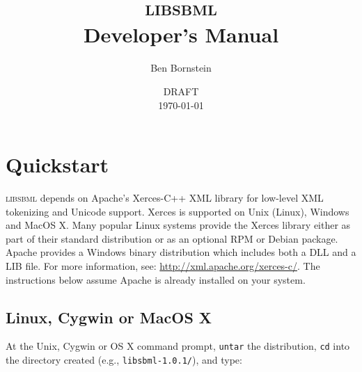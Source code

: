 \documentclass{sbmlmanual}
\newcommand{\libsbml}{\textsc{libsbml}}
\begin{document}

\title{\libsbml{}\\[5pt]
  Developer's Manual}

\author{Ben Bornstein}


\address{SBML Team\\
  Control and Dynamical Systems, MC 107-81\\
  California Institute of Technology, Pasadena, CA 91125, USA\\[3pt]
  {\url{http://sbml.org/}}}


\date{DRAFT\\[5pt]
  \today{}}

\maketitlepage




\section{Quickstart}
\label{sec:quickstart-unix}

\libsbml{} depends on Apache's Xerces-C++ XML library for
low-level XML tokenizing and Unicode support.  Xerces is supported on
Unix (Linux), Windows and MacOS X.  Many popular Linux systems provide
the Xerces library either as part of their standard distribution or as
an optional RPM or Debian package.  Apache provides a Windows binary
distribution which includes both a DLL and a LIB file.  For more
information, see: \url{http://xml.apache.org/xerces-c/}.  The
instructions below assume Apache is already installed on your system.


\subsection{Linux, Cygwin or MacOS X}

At the Unix, Cygwin or OS X command prompt, \texttt{untar} the
distribution, \texttt{cd} into the directory created (e.g.,
\texttt{libsbml-1.0.1/}), and type:
\end{document}
